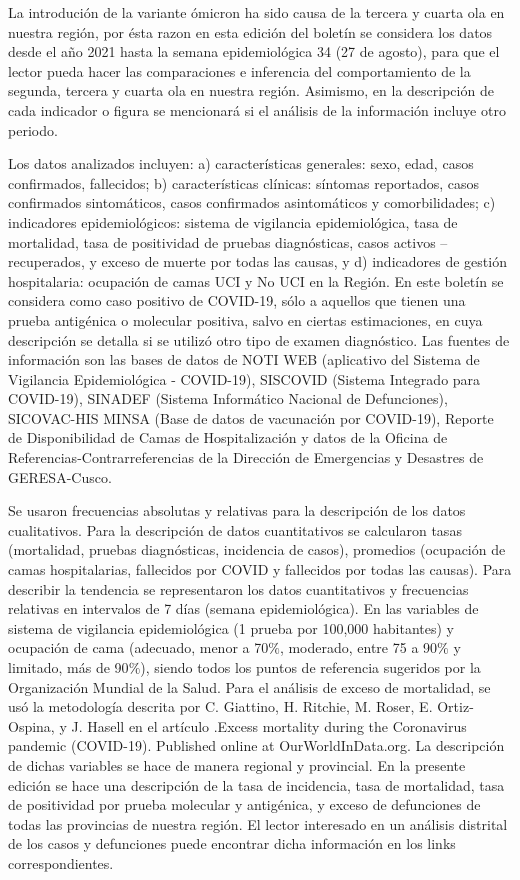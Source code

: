 \documentclass[12pt,a4paper,openany]{book}
\begin{document}
	La introdución de la variante ómicron ha sido causa de la tercera y cuarta ola en nuestra región, por ésta razon en esta edición del boletín se considera los datos desde el año 2021 hasta la
	semana epidemiológica  34 (27 de agosto), para que el lector pueda hacer las comparaciones
	e inferencia del comportamiento de la segunda, tercera y cuarta ola en nuestra región. Asimismo, en la descripción de cada indicador o figura se mencionará si el análisis de
	la información incluye otro periodo.
	
	Los datos analizados incluyen: a) características generales: sexo, edad, casos confirmados,
	fallecidos; b) características clínicas: síntomas reportados, casos confirmados sintomáticos, casos
	confirmados asintomáticos y comorbilidades; c) indicadores epidemiológicos: sistema de vigilancia
	epidemiológica, tasa de mortalidad, tasa de positividad de pruebas diagnósticas, casos activos –
	recuperados, y exceso de muerte por todas las causas, y d) indicadores de gestión hospitalaria: 
	ocupación de camas UCI y No UCI en la Región. En este boletín se considera como caso positivo de
	COVID-19, sólo a aquellos que tienen una prueba antigénica o molecular positiva, salvo en ciertas
	estimaciones, en cuya descripción se detalla si se utilizó otro tipo de examen diagnóstico.
	Las fuentes de información son las bases de datos de NOTI WEB (aplicativo del Sistema de
	Vigilancia Epidemiológica - COVID-19), SISCOVID (Sistema Integrado para COVID-19), SINADEF
	(Sistema Informático Nacional de Defunciones), SICOVAC-HIS MINSA (Base de datos de vacunación
	por COVID-19), Reporte de Disponibilidad de Camas de Hospitalización y datos de la Oficina de
	Referencias-Contrarreferencias de la Dirección de Emergencias y Desastres de GERESA-Cusco.

	Se usaron frecuencias absolutas y relativas para la descripción de los datos cualitativos. Para la
	descripción de datos cuantitativos se calcularon tasas (mortalidad, pruebas diagnósticas, incidencia de
	casos), promedios (ocupación de camas hospitalarias, fallecidos por COVID y fallecidos por todas las
	causas). Para describir la tendencia se representaron los datos cuantitativos y frecuencias relativas en
	intervalos de 7 días (semana epidemiológica). En las variables de sistema de vigilancia epidemiológica
		(1 prueba por 100,000 habitantes) y ocupación de cama (adecuado, menor a 70$\%$, moderado,
	entre 75 a 90$\%$ y limitado, más de 90$\%$), siendo todos los puntos de referencia sugeridos por la
	Organización Mundial de la Salud. Para el análisis de exceso de mortalidad, se usó la metodología
	descrita por C. Giattino, H. Ritchie, M. Roser, E. Ortiz-Ospina, y J. Hasell en el artículo .Excess
	mortality during the Coronavirus pandemic (COVID-19). Published online at OurWorldInData.org.
	La descripción de dichas variables se hace de manera regional y provincial. En la presente edición
	se hace una descripción de la tasa de incidencia, tasa de mortalidad, tasa de positividad por prueba
	molecular y antigénica, y exceso de defunciones de todas las provincias de nuestra región. El lector
	interesado en un análisis distrital de los casos y defunciones puede encontrar dicha información en
	los links correspondientes.
	
\end{document}

